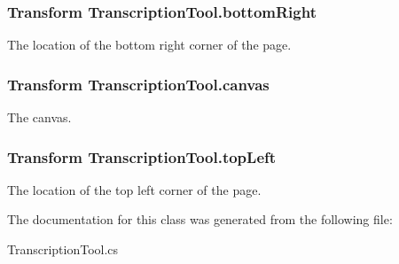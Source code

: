 \subsubsection[{bottom\+Right}]{\setlength{\rightskip}{0pt plus 5cm}Transform Transcription\+Tool.\+bottom\+Right}\label{class_transcription_tool_a7fc3f48e81e40135739550028b5ee63b}


The location of the bottom right corner of the page. 

\subsubsection[{canvas}]{\setlength{\rightskip}{0pt plus 5cm}Transform Transcription\+Tool.\+canvas}\label{class_transcription_tool_a1a5a59f37fde0ed8d52fa2af9d7a3561}


The canvas. 

\subsubsection[{top\+Left}]{\setlength{\rightskip}{0pt plus 5cm}Transform Transcription\+Tool.\+top\+Left}\label{class_transcription_tool_ac5ef003ae5d7745a53d8ee5fbb3ffda2}


The location of the top left corner of the page. 



The documentation for this class was generated from the following file\+:\begin{DoxyCompactItemize}
\item 
Transcription\+Tool.\+cs\end{DoxyCompactItemize}
